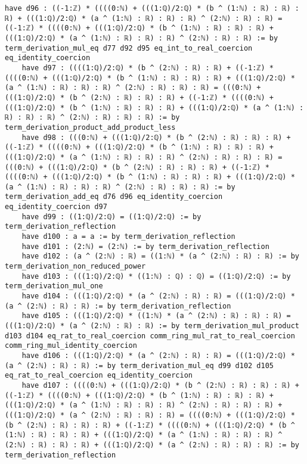 \documentclass{article}
\begin{document}
\begin{tcolorbox}[colback=white!10, width=\linewidth]
\begin{lstlisting}[language=Lean4]
    have d96 : ((-1:ℤ) * ((((0:ℕ) + (((1:ℚ)/2:ℚ) * (b ^ (1:ℕ) : ℝ) : ℝ) : ℝ) + (((1:ℚ)/2:ℚ) * (a ^ (1:ℕ) : ℝ) : ℝ) : ℝ) ^ (2:ℕ) : ℝ) : ℝ) = ((-1:ℤ) * ((((0:ℕ) + (((1:ℚ)/2:ℚ) * (b ^ (1:ℕ) : ℝ) : ℝ) : ℝ) + (((1:ℚ)/2:ℚ) * (a ^ (1:ℕ) : ℝ) : ℝ) : ℝ) ^ (2:ℕ) : ℝ) : ℝ) := by term_derivation_mul_eq d77 d92 d95 eq_int_to_real_coercion eq_identity_coercion
    have d97 : ((((1:ℚ)/2:ℚ) * (b ^ (2:ℕ) : ℝ) : ℝ) + ((-1:ℤ) * ((((0:ℕ) + (((1:ℚ)/2:ℚ) * (b ^ (1:ℕ) : ℝ) : ℝ) : ℝ) + (((1:ℚ)/2:ℚ) * (a ^ (1:ℕ) : ℝ) : ℝ) : ℝ) ^ (2:ℕ) : ℝ) : ℝ) : ℝ) = (((0:ℕ) + (((1:ℚ)/2:ℚ) * (b ^ (2:ℕ) : ℝ) : ℝ) : ℝ) + ((-1:ℤ) * ((((0:ℕ) + (((1:ℚ)/2:ℚ) * (b ^ (1:ℕ) : ℝ) : ℝ) : ℝ) + (((1:ℚ)/2:ℚ) * (a ^ (1:ℕ) : ℝ) : ℝ) : ℝ) ^ (2:ℕ) : ℝ) : ℝ) : ℝ) := by term_derivation_product_add_product_less
    have d98 : (((0:ℕ) + (((1:ℚ)/2:ℚ) * (b ^ (2:ℕ) : ℝ) : ℝ) : ℝ) + ((-1:ℤ) * ((((0:ℕ) + (((1:ℚ)/2:ℚ) * (b ^ (1:ℕ) : ℝ) : ℝ) : ℝ) + (((1:ℚ)/2:ℚ) * (a ^ (1:ℕ) : ℝ) : ℝ) : ℝ) ^ (2:ℕ) : ℝ) : ℝ) : ℝ) = (((0:ℕ) + (((1:ℚ)/2:ℚ) * (b ^ (2:ℕ) : ℝ) : ℝ) : ℝ) + ((-1:ℤ) * ((((0:ℕ) + (((1:ℚ)/2:ℚ) * (b ^ (1:ℕ) : ℝ) : ℝ) : ℝ) + (((1:ℚ)/2:ℚ) * (a ^ (1:ℕ) : ℝ) : ℝ) : ℝ) ^ (2:ℕ) : ℝ) : ℝ) : ℝ) := by term_derivation_add_eq d76 d96 eq_identity_coercion eq_identity_coercion d97
    have d99 : ((1:ℚ)/2:ℚ) = ((1:ℚ)/2:ℚ) := by term_derivation_reflection
    have d100 : a = a := by term_derivation_reflection
    have d101 : (2:ℕ) = (2:ℕ) := by term_derivation_reflection
    have d102 : (a ^ (2:ℕ) : ℝ) = ((1:ℕ) * (a ^ (2:ℕ) : ℝ) : ℝ) := by term_derivation_non_reduced_power
    have d103 : (((1:ℚ)/2:ℚ) * ((1:ℕ) : ℚ) : ℚ) = ((1:ℚ)/2:ℚ) := by term_derivation_mul_one
    have d104 : (((1:ℚ)/2:ℚ) * (a ^ (2:ℕ) : ℝ) : ℝ) = (((1:ℚ)/2:ℚ) * (a ^ (2:ℕ) : ℝ) : ℝ) := by term_derivation_reflection
    have d105 : (((1:ℚ)/2:ℚ) * ((1:ℕ) * (a ^ (2:ℕ) : ℝ) : ℝ) : ℝ) = (((1:ℚ)/2:ℚ) * (a ^ (2:ℕ) : ℝ) : ℝ) := by term_derivation_mul_product d103 d104 eq_rat_to_real_coercion comm_ring_mul_rat_to_real_coercion comm_ring_mul_identity_coercion
    have d106 : (((1:ℚ)/2:ℚ) * (a ^ (2:ℕ) : ℝ) : ℝ) = (((1:ℚ)/2:ℚ) * (a ^ (2:ℕ) : ℝ) : ℝ) := by term_derivation_mul_eq d99 d102 d105 eq_rat_to_real_coercion eq_identity_coercion
    have d107 : ((((0:ℕ) + (((1:ℚ)/2:ℚ) * (b ^ (2:ℕ) : ℝ) : ℝ) : ℝ) + ((-1:ℤ) * ((((0:ℕ) + (((1:ℚ)/2:ℚ) * (b ^ (1:ℕ) : ℝ) : ℝ) : ℝ) + (((1:ℚ)/2:ℚ) * (a ^ (1:ℕ) : ℝ) : ℝ) : ℝ) ^ (2:ℕ) : ℝ) : ℝ) : ℝ) + (((1:ℚ)/2:ℚ) * (a ^ (2:ℕ) : ℝ) : ℝ) : ℝ) = ((((0:ℕ) + (((1:ℚ)/2:ℚ) * (b ^ (2:ℕ) : ℝ) : ℝ) : ℝ) + ((-1:ℤ) * ((((0:ℕ) + (((1:ℚ)/2:ℚ) * (b ^ (1:ℕ) : ℝ) : ℝ) : ℝ) + (((1:ℚ)/2:ℚ) * (a ^ (1:ℕ) : ℝ) : ℝ) : ℝ) ^ (2:ℕ) : ℝ) : ℝ) : ℝ) + (((1:ℚ)/2:ℚ) * (a ^ (2:ℕ) : ℝ) : ℝ) : ℝ) := by term_derivation_reflection

\end{lstlisting}
\end{tcolorbox}
\end{document}
